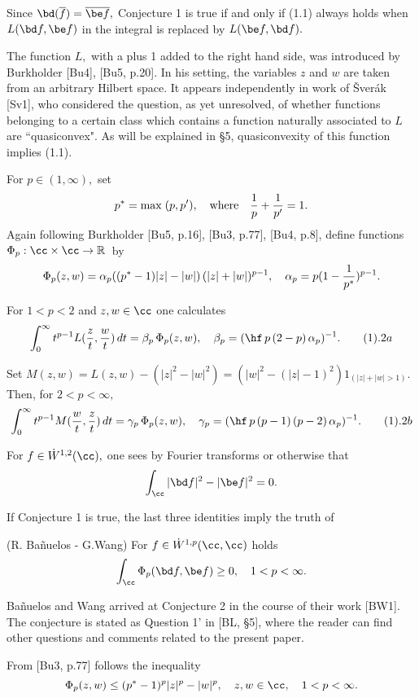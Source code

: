 Since $\bd (\overline{f}) = \overline{\be f},$  Conjecture 1 is true if and 
only if (1.1) always holds when $L(\bd f,\be f)$ in the integral is replaced by
$L(\be f, \bd f).$ 
                                            
The function $L,$ with a plus 1 added to the right hand side, was introduced 
by 
Burkholder [Bu4], [Bu5, p.20]. In his setting, the variables $z$ and $w$ are 
taken from an arbitrary Hilbert space. It appears independently in work of 
\v Sver\'ak [Sv1], who considered the question, as yet unresolved, of whether 
functions belonging to a certain class which contains a function 
naturally associated to $L$ are ``quasiconvex". As will  
be explained in \S 5, quasiconvexity of this function implies (1.1). 

For $p\in (1, \infty),$ set 
$$p^* = \max\; (p, p'), \quad \text{where}\quad {1\over p} + {1\over {p'}} = 
1.$$ Again following Burkholder [Bu5, p.16], [Bu3, p.77], [Bu4, p.8], 
define functions ${\Phi}_p :\cc \times \cc \rightarrow \Bbb R\,$ by
$$  {\Phi}_p(z,w) = {\alpha}_p ((p^* - 1)|z| - |w|)\,(|z| + |w|)^{p-1},\quad 
{\alpha_p} = p(1 - {1\over {p^*}})^{p-1}.$$

For $1<p<2$ and $z, w\in \cc$ one calculates $$\int_0^{\infty} t^{p-
1}L({z\over t}, {w\over t})\,dt =  {\beta}_p\,{\Phi}_p(z,w),
\quad {\beta}_p = (\hf\,  p\,(2-p)\,{\alpha}_p)^{-1}.\tag1.2a$$           

Set $M(z,w) = L(z,w) - (|z|^2 - |w|^2) = (|w|^2 - (|z|-1)^2) 1_{(|z|+|w| > 
1)}.$ Then, for $2<p<\infty,$ 
$$\int_0^{\infty} t^{p-1}M({w\over t}, {z\over t})\,dt =  
{\gamma}_p\,{\Phi}_p(z,w),\quad {\gamma}_p = (\hf\, p\,(p-1)\,(p-2)\,{\alpha}_p )^{- 
1}.\tag1.2b$$  

For $f\in \dot W^{1,2}(\cc),$  one sees by
Fourier transforms or otherwise that $$\int_{\cc} |\bd f|^2 - |\be f|^2 = 0.$$

If Conjecture 1 is true, the last three identities imply the truth of

 (R. Ba\~nuelos - G.Wang) For 
$f\in \dot W^{1,p}(\cc, \cc)$ holds
$$\icc {\Phi}_p(\bd f, \be f) \geq 0, \quad 1<p<\infty.$$ \endproclaim

Ba\~nuelos and Wang arrived at Conjecture 2 in the course of their work [BW1].
The conjecture is stated as Question 1' in [BL, \S 5], where the reader can 
find other questions and comments related to the present paper.

From [Bu3, p.77] follows the inequality
$${\Phi}_p (z,w) \leq  (p^* - 1)^p |z|^p - |w|^p ,\quad z,w \in \cc, \quad 1<p<\infty.$$


